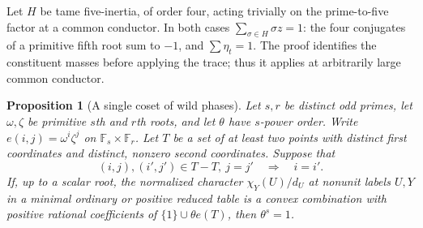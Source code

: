 \documentclass[11pt,a4paper]{article}
\numberwithin{equation}{section}
\newtheorem{proposition}[theorem]{Proposition}
\theoremstyle{remark}
\begin{document}
Let $H$ be tame five-inertia, of order four, acting trivially on the
prime-to-five factor at a common conductor. In both cases
$\sum_{\sigma\in H}\sigma z=1$: the four conjugates of a primitive
fifth root sum to $-1$, and $\sum\eta_t=1$.
The proof identifies the constituent masses before applying the trace;
thus it applies at arbitrarily large common conductor.
\begin{proposition}[A single coset of wild phases]\label{found:S:5.2}
\label{found:S:key:prop:exceptional-tame}
Let $s,r$ be distinct odd primes, let $\omega,\zeta$ be primitive
$s$th and $r$th roots, and let $\theta$ have $s$-power order. Write
$e(i,j)=\omega^i\zeta^j$ on $\mathbb F_s\times\mathbb F_r$.
Let $T$ be a set of at least two points with distinct first coordinates
and distinct, nonzero second coordinates. Suppose that
\[
 (i,j),(i',j')\in T-T,\ j=j' \quad\Longrightarrow\quad i=i'.
\]
If, up to a scalar root, the normalized character $\chi_Y(U)/d_U$ at
nonunit labels $U,Y$ in a minimal ordinary or positive reduced table
is a convex combination with positive rational coefficients of
$\{1\}\cup\theta e(T)$, then $\theta^s=1$.
\end{proposition}
\end{document}
